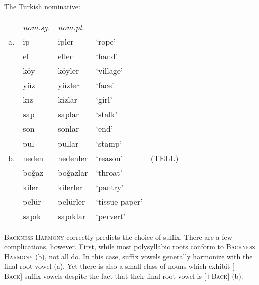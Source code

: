 \begin{example}
The Turkish nominative: 

\vspace{0.5\baselineskip}
\begin{tabular}{l l l l l}
   & \emph{nom.sg.} & \emph{nom.pl.} \\ 
a. & ip             & ipler          & `rope' & \citep[][216]{Clements1982} \\
   & el             & eller          & `hand'    \\
   & köy            & köyler         & `village' \\
   & yüz            & yüzler         & `face'    \\
   & kız            & kizlar         & `girl'    \\
   & sap            & saplar         & `stalk'   \\
   & son            & sonlar         & `end'     \\
   & pul            & pullar         & `stamp'   \\
b. & neden          & nedenler       & `reason'  & (TELL) \\
   & boğaz          & boğazlar       & `throat'  \\
   & kiler          & kilerler       & `pantry'  \\
   & pelür          & pelürler       & `tissue paper' \\
   & sapık          & sapıklar       & `pervert' \\
\end{tabular}
\end{example}

\noindent
\textsc{Backness Harmony} correctly predicts the choice of suffix. There are a few complications, however. First, while most polysyllabic roots conform to \textsc{Backness Harmony} (\lastx b), not all do. In this case, suffix vowels generally harmonize with the final root vowel (\nextx a). Yet there is also a small class of nouns which exhibit [$-$\textsc{Back}] suffix vowels despite the fact that their final root vowel is [$+$\textsc{Back}] (\nextx b).

